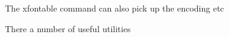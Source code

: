 \begin{teX}
\end{teX}




The xfontable command can also pick up the encoding etc

\begin{teXXX}
\end{teXXX}


There a number of useful utilities




\clearpage


